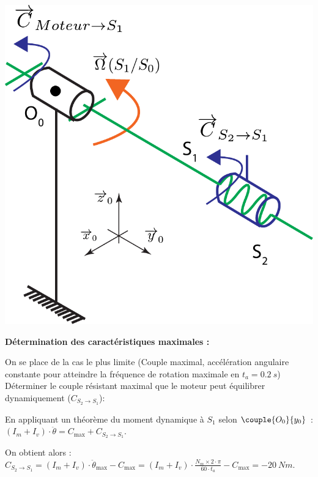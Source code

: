 \begin{multicols}{2}
\ifprof
\begin{corrige}
\begin{center}
\includegraphics[width=.4\linewidth]{images/schema_cine_depose_rotation.pdf}
\end{center}

\textbf{Détermination des caractéristiques maximales : }


On se place de la cas le plus limite (Couple maximal, accélération angulaire constante pour atteindre la fréquence de rotation maximale en $t_a=\SI{0,2}{s}$)
Déterminer le couple résistant maximal que le moteur peut équilibrer dynamiquement ($C_{S_2\to S_1}$):

En appliquant un théorème du moment dynamique à $S_1$ selon $\couple{O_0}{{y}_0}$ :
$(I_m+I_v)\cdot \ddot{\theta}=C_{\text{max}}+C_{S_2\to S_1}$. 

On obtient alors : 
$C_{S_2\to S_1}=(I_m+I_v)\cdot \ddot{\theta}_{\text{max}}-C_{\text{max}}=(I_m+I_v)\cdot \frac{N_m\times 2\cdot \pi}{60\cdot t_a}-C_{\text{max}}=-\SI{20}{Nm}$.



\end{corrige}
\else
\fi



\end{multicols}
